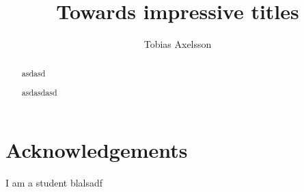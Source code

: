 \documentclass[11pt]{report} %
\title{Towards impressive titles}
\author{Tobias Axelsson}
\begin{document}
\maketitle

\chapter*{Acknowledgements}
	\thispagestyle{empty}
	I am a student blalsadf

\begin{abstract}
	asdasd
\end{abstract}

\begin{abstract}
	asdasdasd
\end{abstract}

\tableofcontents
	\thispagestyle{empty}














\printbibliography
\end{document}

